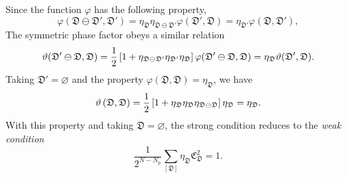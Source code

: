 Since the function $\varphi$ has the following property,
\[
\varphi(\mathfrak{D}\ominus\mathfrak{D}',\mathfrak{D}') = \eta_{\mathfrak{D}}\eta_{\mathfrak{D}\ominus\mathfrak{D}'} \varphi(\mathfrak{D}',\mathfrak{D})
=
\eta_{\mathfrak{D}'} \varphi(\mathfrak{D},\mathfrak{D}'),
\]
The symmetric phase factor obeys a similar relation
\[
\vartheta(\mathfrak{D}'\ominus\mathfrak{D},\mathfrak{D})
=
\frac{1}{2}
\left[ 
    1
    +
    \eta_{\mathfrak{D}\ominus\mathfrak{D}'}
    \eta_{\mathfrak{D}'}
    \eta_{\mathfrak{D}}
 \right]
\varphi(\mathfrak{D}'\ominus\mathfrak{D},\mathfrak{D}) 
= 
\eta_{\mathfrak{D}}
\vartheta(\mathfrak{D}',\mathfrak{D}).
\]
Taking $\mathfrak{D}' = \varnothing$ and the property $\varphi(\mathfrak{D},\mathfrak{D}) = \eta_\mathfrak{D}$, we have
\[
\vartheta\left( \mathfrak{D},\mathfrak{D} \right) = 
\frac{1}{2}\left[ 1 + \eta_\mathfrak{D}\eta_{\mathfrak{D}} \eta_{\mathfrak{D}\ominus\mathfrak{D}} \right] \eta_\mathfrak{D}
=
\eta_\mathfrak{D}.
\]
With this property and taking $\mathfrak{D} = \varnothing$, the strong condition reduces to the \textit{weak condition}
\begin{equation}\label{eq:weak-condition}
    \frac{1}{2^{N-N_p}}
    \sum_{[\mathfrak{D}]}
    \eta_\mathfrak{D}
    \mathfrak{C}_{\mathfrak{D}}^2
    =
    1.
\end{equation}


